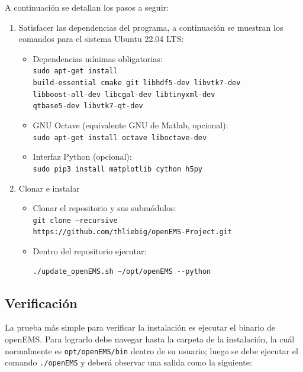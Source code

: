 \documentclass[
    11pt,
    spanish,
    a4paper
]{article}
\begin{document}
A continuación se detallan los pasos a seguir:

\begin{enumerate}
	\item Satisfacer las dependencias del programa, a continuación se muestran los
	      comandos para el sistema Ubuntu 22.04 LTS:
	      \begin{itemize}
		      \item Dependencias mínimas obligatorias:\\
		            \texttt{sudo apt-get install\\
			            build-essential cmake git libhdf5-dev libvtk7-dev\\
			            libboost-all-dev libcgal-dev libtinyxml-dev\\
			            qtbase5-dev libvtk7-qt-dev}
		      \item GNU Octave (equivalente GNU de Matlab, opcional):\\
		            \texttt{sudo apt-get install octave liboctave-dev}
		      \item Interfaz Python (opcional):\\
		            \texttt{sudo pip3 install matplotlib cython h5py}
	      \end{itemize}
	\item Clonar e instalar
	      \begin{itemize}
		      \item Clonar el repositorio y sus submódulos:\\
		            \texttt{git clone --recursive\\
			            https://github.com/thliebig/openEMS-Project.git}
		      \item Dentro del repositorio ejecutar:
		            \begin{verbatim}
./update_openEMS.sh ~/opt/openEMS --python
        \end{verbatim}
	      \end{itemize}
\end{enumerate}

\subsection{Verificación}
\label{sub:overificacion}

La prueba más simple para verificar la instalación es ejecutar el binario de
openEMS.
Para lograrlo debe navegar hasta la carpeta de la instalación, la cuál
normalmente es \texttt{opt/openEMS/bin} dentro de su usuario; luego se debe ejecutar
el comando \texttt{./openEMS} y deberá observar una salida como la siguiente:
\end{document}

